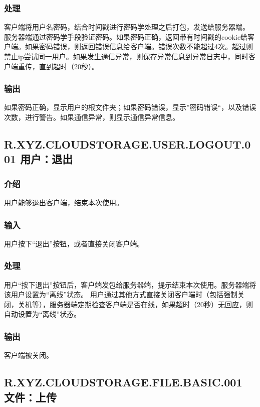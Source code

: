 \subsubsection{处理}
客户端将用户名密码，结合时间戳进行密码学处理之后打包，发送给服务器端。
服务器端通过密码学手段验证密码。如果密码正确，返回带有时间戳的cookie给客户端。如果密码错误，则返回错误信息给客户端。错误次数不能超过4次。超过则禁止ip尝试同一用户。如果发生通信异常，则保存异常信息到异常日志中，同时客户端重传，直到超时（20秒）。

\subsubsection{输出}
如果密码正确，显示用户的根文件夹；如果密码错误，显示”密码错误“，以及错误次数，进行警告。如果通信异常，则显示通信异常信息。

\subsection{R.XYZ.CLOUDSTORAGE.USER.LOGOUT.001 用户：退出 }

\subsubsection{介绍}
用户能够退出客户端，结束本次使用。

\subsubsection{输入}
用户按下“退出”按钮，或者直接关闭客户端。

\subsubsection{处理}
用户“按下退出”按钮后，客户端发包给服务器端，提示结束本次使用。服务器端将该用户设置为“离线”状态。
用户通过其他方式直接关闭客户端时（包括强制关闭，关机等），服务器端定期检查客户端是否在线，如果超时（20秒）无回应，则自动设置为“离线”状态。

\subsubsection{输出}
客户端被关闭。

\subsection{R.XYZ.CLOUDSTORAGE.FILE.BASIC.001 文件：上传}

